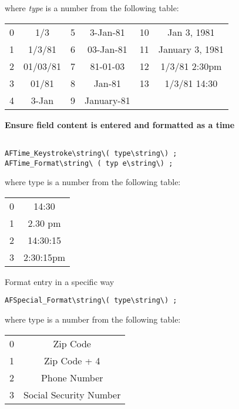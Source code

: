 where \emph{type} is a number from the following table: 

\begin{center}
  \begin{tabular}{cccccc}
  0 & 1/3      & 5 & 3-Jan-81   & 10 & Jan 3, 1981     \\
  1 & 1/3/81   & 6 & 03-Jan-81  & 11 & January 3, 1981 \\
  2 & 01/03/81 & 7 & 81-01-03   & 12 & 1/3/81  2:30pm  \\
  3 & 01/81    & 8 & Jan-81     & 13 & 1/3/81  14:30   \\
  4 & 3-Jan    & 9 & January-81                        \\
  \end{tabular}
\end{center}


\noindent\textbf{Ensure field content is entered and formatted as a time}

\begin{verbatim}

AFTime_Keystroke\string\( type\string\) ; 
AFTime_Format\string\ ( typ e\string\) ; 

\end{verbatim}

where type is a number from the following table: 

\begin{center}
  \begin{tabular}{cc}
  0 & 14:30     \\
  1 & 2.30 pm   \\
  2 & 14:30:15  \\
  3 & 2:30:15pm \\
  \end{tabular}
\end{center}

Format entry in a specific way 

\begin{verbatim}
AFSpecial_Format\string\( type\string\) ; 
\end{verbatim}

where type is a number from the following table: 

\begin{center}
  \begin{tabular}{cc}
  0 & Zip Code               \\
  1 & Zip Code + 4           \\
  2 & Phone Number           \\
  3 & Social Security Number \\
  \end{tabular}
\end{center}

